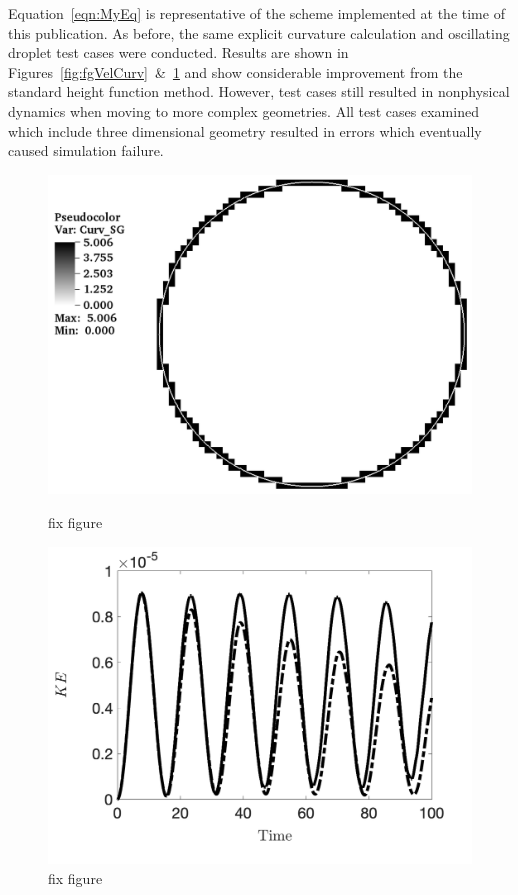 Equation~\ref{eqn:MyEq} is representative of the scheme implemented at the time of this publication. As before, the same explicit curvature calculation and oscillating droplet test cases were conducted. Results are shown in Figures~\ref{fig:fgVelCurv}~\&~\ref{fig:fgVelKE} and show considerable improvement from the standard height function method. However, test cases still resulted in nonphysical dynamics when moving to more complex geometries. All test cases examined which include three dimensional geometry resulted in errors which eventually caused simulation failure. 
\begin{figure}[htbp]
	\centering
	\begin{minipage}{.5\textwidth}
		\centering
		\includegraphics[width=1.0\linewidth]{figs/curvCalc.png}
		\caption{fix figure}
		\label{fig:fgVelCurv}
	\end{minipage}%
	\begin{minipage}{0.5\textwidth}
		\centering
		\includegraphics[width=1.0\linewidth]{figs/current_KEplot.png}
		\caption{fix figure}
		\label{fig:fgVelKE}
	\end{minipage}
\end{figure}
